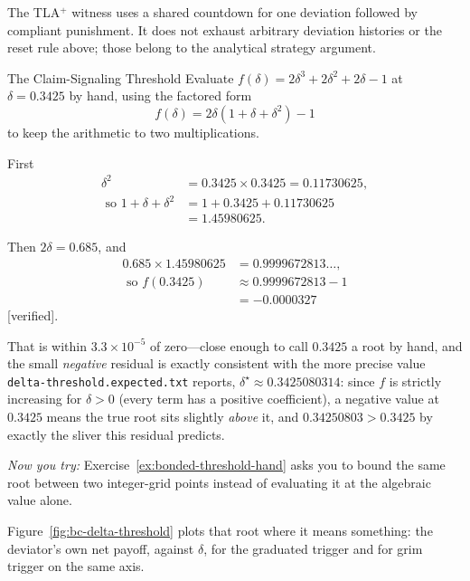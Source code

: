 \documentclass[11pt,a4paper]{article}
\theoremstyle{definition}
\theoremstyle{remark}
\begin{document}
The TLA$^{+}$ witness uses a shared countdown for one deviation followed by
compliant punishment. It does not exhaust arbitrary deviation histories or
the reset rule above; those belong to the analytical strategy argument.

\pdexercisepointerone*{\ref{ex:bonded-claim-signaling-pd}}{\pageref{ex:bonded-claim-signaling-pd}}

\begin{pdexample}{The Claim-Signaling Threshold}
\setlength{\parskip}{4pt plus 1pt}
Evaluate $f(\delta) = 2\delta^3+2\delta^2+2\delta-1$ at $\delta=0.3425$ by hand, using the factored form \[
f(\delta)=2\delta(1+\delta+\delta^2)-1
\] to keep the arithmetic to two multiplications.

First \[
\begin{aligned}
\delta^2 &= 0.3425 \times 0.3425 = 0.11730625,\\
\text{ so }1+\delta+\delta^2 &= 1 + 0.3425 + 0.11730625\\
&= 1.45980625.
\end{aligned}
\]

Then $2\delta = 0.685$, and \[
\begin{aligned}
0.685 \times 1.45980625 &= 0.9999672813\ldots,\\
\text{ so }f(0.3425) &\approx 0.9999672813 - 1\\
&= -0.0000327
\end{aligned}
\] [verified].

That is within $3.3\times10^{-5}$ of zero---close enough to call $0.3425$ a root by hand, and the small \emph{negative} residual is exactly consistent with the more precise value \texttt{delta-threshold.expected.txt} reports, $\delta^\star \approx 0.3425080314$: since $f$ is strictly increasing for $\delta>0$ (every term has a positive coefficient), a negative value at $0.3425$ means the true root sits slightly \emph{above} it, and $0.34250803 > 0.3425$ by exactly the sliver this residual predicts.

\emph{Now you try:} Exercise~\ref{ex:bonded-threshold-hand} asks you to bound the same root between two integer-grid points instead of evaluating it at the algebraic value alone.
\end{pdexample}

Figure~\ref{fig:bc-delta-threshold} plots that root where it means something:
the deviator's own net payoff, against $\delta$, for the graduated trigger and
for grim trigger on the same axis.


\FloatBarrier
\end{document}
